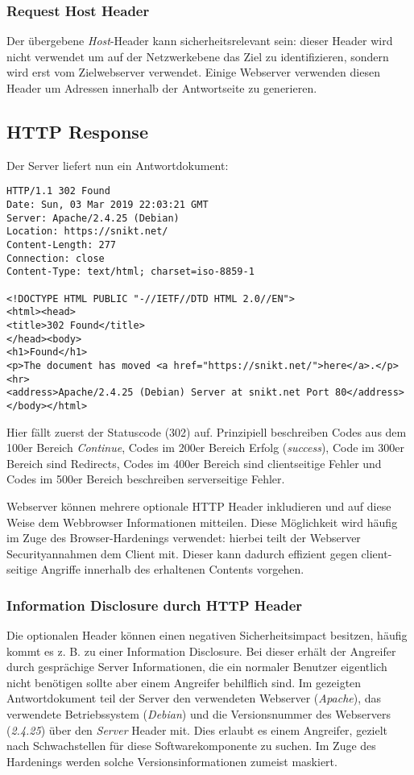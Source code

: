 \subsubsection{Request Host Header}

Der übergebene \textit{Host}-Header kann sicherheitsrelevant sein: dieser Header wird nicht verwendet um auf der Netzwerkebene das Ziel zu identifizieren, sondern wird erst vom Zielwebserver verwendet. Einige Webserver verwenden diesen Header um Adressen innerhalb der Antwortseite zu generieren.

\subsection{HTTP Response}

Der Server liefert nun ein Antwortdokument:

\begin{verbatim}
HTTP/1.1 302 Found
Date: Sun, 03 Mar 2019 22:03:21 GMT
Server: Apache/2.4.25 (Debian)
Location: https://snikt.net/
Content-Length: 277
Connection: close
Content-Type: text/html; charset=iso-8859-1

<!DOCTYPE HTML PUBLIC "-//IETF//DTD HTML 2.0//EN">
<html><head>
<title>302 Found</title>
</head><body>
<h1>Found</h1>
<p>The document has moved <a href="https://snikt.net/">here</a>.</p>
<hr>
<address>Apache/2.4.25 (Debian) Server at snikt.net Port 80</address>
</body></html>
\end{verbatim}

Hier fällt zuerst der Statuscode (302) auf. Prinzipiell beschreiben Codes aus dem 100er Bereich \textit{Continue}, Codes im 200er Bereich Erfolg (\textit{success}), Code im 300er Bereich sind Redirects, Codes im 400er Bereich sind clientseitige Fehler und Codes im 500er Bereich beschreiben serverseitige Fehler.

Webserver können mehrere optionale HTTP Header inkludieren und auf diese Weise dem Webbrowser Informationen mitteilen. Diese Möglichkeit wird häufig im Zuge des Browser-Hardenings verwendet: hierbei teilt der Webserver Securityannahmen dem Client mit. Dieser kann dadurch effizient gegen client-seitige Angriffe innerhalb des erhaltenen Contents vorgehen.

\subsubsection{Information Disclosure durch HTTP Header}

Die optionalen Header können einen negativen Sicherheitsimpact besitzen, häufig kommt es z. B. zu einer Information Disclosure. Bei dieser erhält der Angreifer durch gesprächige Server Informationen, die ein normaler Benutzer eigentlich nicht benötigen sollte aber einem Angreifer behilflich sind. Im gezeigten Antwortdokument teil der Server den verwendeten Webserver (\textit{Apache}), das verwendete Betriebssystem (\textit{Debian}) und die Versionsnummer des Webservers (\textit{2.4.25}) über den \textit{Server} Header mit. Dies erlaubt es einem Angreifer, gezielt nach Schwachstellen für diese Softwarekomponente zu suchen. Im Zuge des Hardenings werden solche Versionsinformationen zumeist maskiert.

